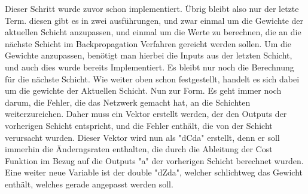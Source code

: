 \documentclass[12pt]{article}
\begin{document}
Dieser Schritt wurde zuvor schon implementiert.
Übrig bleibt also nur der letzte Term. diesen gibt es in zwei ausführungen, und zwar einmal um die Gewichte der aktuellen Schicht anzupassen, und einmal um die Werte zu berechnen, die an die nächste Schicht im Backpropagation Verfahren gereicht werden sollen.
Um die Gewichte anzupassen, benötigt man hierbei die Inputs aus der letzten Schicht, und auch dies wurde bereits Implementiert. Es bleibt nur noch die Berechnung für die nächste Schicht. Wie weiter oben schon festgestellt, handelt es sich dabei um die gewichte der Aktuellen Schicht. 
Nun zur Form. Es geht immer noch darum, die Fehler, die das Netzwerk gemacht hat, an die Schichten weiterzureichen. Daher muss ein Vektor erstellt werden, der den Outputs der vorherigen Schicht entspricht, und die Fehler enthält, die von der Schicht verursacht wurden.
Dieser Vektor wird nun als "dCda" erstellt, denn er soll immerhin die Änderngsraten enthalten, die durch die Ableitung der Cost Funktion im Bezug auf die Outputs "a" der vorherigen Schicht berechnet wurden. Eine weiter neue Variable ist der double "dZda", welcher schlichtweg das Gewicht enthält, welches gerade angepasst werden soll.
\end{document}
